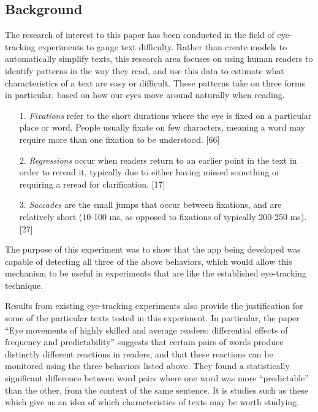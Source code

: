 \documentclass[11pt,letterpaper]{article}
\begin{document}
	\subsection{Background}
	
	The research of interest to this paper has been conducted in the field of eye-tracking experiments to gauge text difficulty. Rather than create models to automatically simplify texts, this research area focuses on using human readers to identify patterns in the way they read, and use this data to estimate what characteristics of a text are easy or difficult. These patterns take on three forms in particular, based on how our eyes move around naturally when reading.
	
	\begin{itemize}[noitemsep]
		\item[1.] \textit{Fixations} refer to the short durations where the eye is fixed on a particular place or word. People usually fixate on few characters, meaning a word may require more than one fixation to be understood. [66]
		\item[2.] \textit{Regressions} occur when readers return to an earlier point in the text in order to reread it, typically due to either having missed something or requiring a reread for clarification. [17]
		\item[3.] \textit{Saccades} are the small jumps that occur between fixations, and are relatively short (10-100 ms, as opposed to fixations of typically 200-250 ms). [27]
	\end{itemize}
	
	The purpose of this experiment was to show that the app being developed was capable of detecting all three of the above behaviors, which would allow this mechanism to be useful in experiments that are like the established eye-tracking technique.
	
	Results from existing eye-tracking experiments also provide the justification for some of the particular texts tested in this experiment. In particular, the paper ``Eye movements of highly skilled and average readers: differential effects of frequency and predictability'' suggests that certain pairs of words produce distinctly different reactions in readers, and that these reactions can be monitored using the three behaviors listed above. They found a statistically significant difference between word pairs where one word was more ``predictable'' than the other, from the context of the same sentence. It is studies such as these which give us an idea of which characteristics of texts may be worth studying.
	
\end{document}
